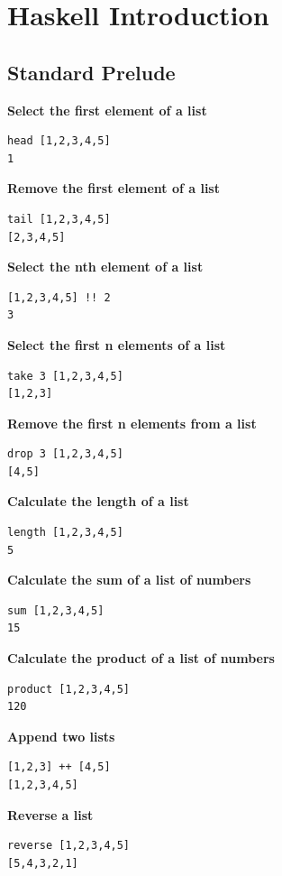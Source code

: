 
\section{Haskell Introduction}
\subsection{Standard Prelude}
\textbf{Select the first element of a list}
\begin{lstlisting}
head [1,2,3,4,5]
1
\end{lstlisting}
\textbf{Remove the first element of a list}
\begin{lstlisting}
tail [1,2,3,4,5]
[2,3,4,5]
\end{lstlisting}
\textbf{Select the nth element of a list}
\begin{lstlisting}
[1,2,3,4,5] !! 2
3
\end{lstlisting}
\textbf{Select the first n elements of a list}
\begin{lstlisting}
take 3 [1,2,3,4,5]
[1,2,3]
\end{lstlisting}
\textbf{Remove the first n elements from a list}
\begin{lstlisting}
drop 3 [1,2,3,4,5]
[4,5]
\end{lstlisting}
\textbf{Calculate the length of a list}
\begin{lstlisting}
length [1,2,3,4,5]
5
\end{lstlisting}
\textbf{Calculate the sum of a list of numbers}
\begin{lstlisting}
sum [1,2,3,4,5]
15
\end{lstlisting}
\textbf{Calculate the product of a list of numbers}
\begin{lstlisting}
product [1,2,3,4,5]
120
\end{lstlisting}
\textbf{Append two lists}
\begin{lstlisting}
[1,2,3] ++ [4,5]
[1,2,3,4,5]
\end{lstlisting}
\textbf{Reverse a list}
\begin{lstlisting}
reverse [1,2,3,4,5]
[5,4,3,2,1]
\end{lstlisting}

